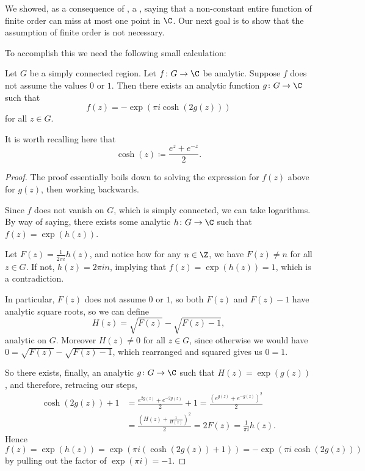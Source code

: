 
We showed, as a consequence of , a , saying that a non-constant entire function of finite order can miss at most one point in $\C$.
Our next goal is to show that the assumption of finite order is not necessary.

To accomplish this we need the following small calculation:

\begin{lemma}\label{lem9.8}
	Let $G$ be a simply connected region.
	Let $f \colon G \to \C$ be analytic.
	Suppose $f$ does not assume the values $0$ or $1$.
	Then there exists an analytic function $g \colon G \to \C$ such that
	\[
		f(z) = - \exp\left(\pi i \cosh(2 g(z))\right)
	\]
	for all $z \in G$.
\end{lemma}

It is worth recalling here that
\[
	\cosh(z) \coloneqq \frac{e^z + e^{-z}}{2}.
\]

\begin{proof}
	The proof essentially boils down to solving the expression for $f(z)$ above for $g(z)$, then working backwards.

	Since $f$ does not vanish on $G$, which is simply connected, we can take logarithms.
	By way of saying, there exists some analytic $h \colon G \to \C$ such that $f(z) = \exp(h(z))$.

	Let $F(z) = \frac{1}{2 \pi i} h(z)$, and notice how for any $n \in \Z$, we have $F(z) \neq n$ for all $z \in G$.
	If not, $h(z) = 2 \pi i n$, implying that $f(z) = \exp(h(z)) = 1$, which is a contradiction.

	In particular, $F(z)$ does not assume $0$ or $1$, so both $F(z)$ and $F(z) - 1$ have analytic square roots, so we can define
	\[
		H(z) = \sqrt{F(z)} - \sqrt{F(z) - 1},
	\]
	analytic on $G$.
	Moreover $H(z) \neq 0$ for all $z \in G$, since otherwise we would have $0 = \sqrt{F(z)} - \sqrt{F(z) - 1}$, which rearranged and squared gives us $0 = 1$.

	So there exists, finally, an analytic $g \colon G \to \C$ such that $H(z) = \exp(g(z))$, and therefore, retracing our steps,
	\begin{align*}
		\cosh(2 g(z)) + 1 &= \frac{e^{2 g(z)} + e^{-2 g(z)}}{2} + 1 = \frac{(e^{g(z)} + e^{-g(z)})^2}{2} \\
		&= \frac{(H(z) + \frac{1}{H(z)})^2}{2} = 2 F(z) = \frac{1}{\pi i} h(z).
	\end{align*}
	Hence
	\[
		f(z) = \exp(h(z)) = \exp(\pi i (\cosh(2 g(z)) + 1)) = - \exp\left(\pi i \cosh(2 g(z))\right)
	\]
	by pulling out the factor of $\exp(\pi i) = -1$.
\end{proof}
